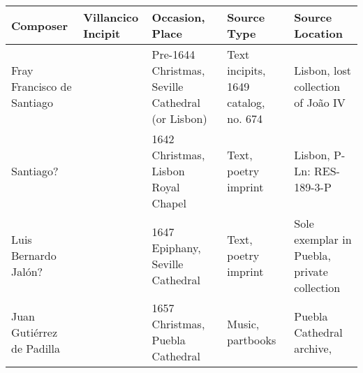 \documentclass{tex/vcbook-float}
\begin{document}
\renewcommand{\arraystretch}{1.5}
\begin{tabulary}{\textwidth}{LLLLL}
    \toprule
    Composer & Villancico Incipit & Occasion, Place & Source Type & Source
    Location \\ \midrule
    
    Fray Francisco de Santiago & 
     &
    Pre-1644 Christmas, Seville Cathedral (or Lisbon) &
    Text incipits, 1649 catalog, no. 674 &
    Lisbon, lost collection of João IV \\

    Santiago? & 
     & 
    1642 Christmas, Lisbon Royal Chapel &
    Text, poetry imprint &
    Lisbon, P-Ln: RES-189-3-P \\

    Luis Bernardo Jalón? & 
     & 
    1647 Epiphany, Seville Cathedral & 
    Text, poetry imprint & 
    Sole exemplar in Puebla, private collection \\

    Juan Gutiérrez de Padilla & 
     & 
    1657 Christmas, Puebla Cathedral & 
    Music, partbooks & 
    Puebla Cathedral archive,  \\
    \bottomrule
\end{tabulary}
\end{document}

